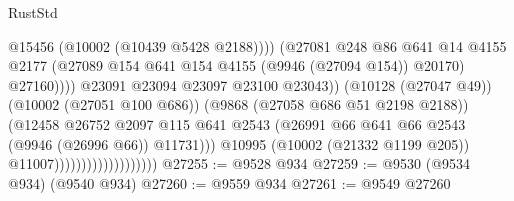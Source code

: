 \begin{lexlean}{RustStd}
\begin{coremodule}
                                                          @15456
                                                          (@10002 (@10439 @5428 @2188))))
                                                      (@27081
                                                        @248
                                                        @86
                                                        @641
                                                        @14
                                                        @4155
                                                        @2177
                                                        (@27089
                                                          @154
                                                          @641
                                                          @154
                                                          @4155
                                                          (@9946 (@27094 @154))
                                                          @20170)
                                                        @27160))))
                                                @23091
                                                @23094
                                                @23097
                                                @23100
                                                @23043))
                                            (@10128 (@27047 @49))
                                            (@10002 (@27051 @100 @686))
                                            (@9868 (@27058 @686 @51 @2198 @2188))
                                            (@12458
                                              @26752
                                              @2097
                                              @115
                                              @641
                                              @2543
                                              (@26991
                                                @66
                                                @641
                                                @66
                                                @2543
                                                (@9946 (@26996 @66))
                                                @11731)))
                                          @10995
                                          (@10002 (@21332 @1199 @205))
                                          @11007)))))))))))))))))))
@27255 := @9528 @934
@27259 := @9530 (@9534 @934) (@9540 @934)
@27260 := @9559 @934
@27261 := @9549 @27260

\end{coremodule}
\end{lexlean}
